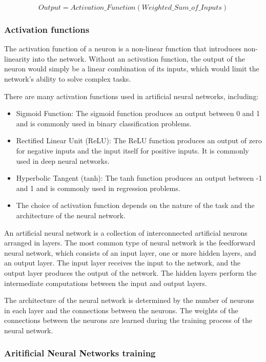 $$Output = Activation\_Function(Weighted\_Sum\_of\_Inputs)$$

\subsubsection*{Activation functions}

The activation function of a neuron is a non-linear function that introduces non-linearity into the network. Without an activation function, the output of the neuron would simply be a linear combination of its inputs, which would limit the network's ability to solve complex tasks.

There are many activation functions used in artificial neural networks, including:

\begin{itemize}
    \item Sigmoid Function: The sigmoid function produces an output between 0 and 1 and is commonly used in binary classification problems.
    \item Rectified Linear Unit (ReLU): The ReLU function produces an output of zero for negative inputs and the input itself for positive inputs. It is commonly used in deep neural networks.
    \item Hyperbolic Tangent (tanh): The tanh function produces an output between -1 and 1 and is commonly used in regression problems.
    \item The choice of activation function depends on the nature of the task and the architecture of the neural network.
\end{itemize}

An artificial neural network is a collection of interconnected artificial neurons arranged in layers. The most common type of neural network is the feedforward neural network, which consists of an input layer, one or more hidden layers, and an output layer. The input layer receives the input to the network, and the output layer produces the output of the network. The hidden layers perform the intermediate computations between the input and output layers.

The architecture of the neural network is determined by the number of neurons in each layer and the connections between the neurons. The weights of the connections between the neurons are learned during the training process of the neural network.

\subsubsection*{Aritificial Neural Networks training}

